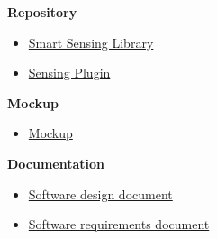\documentclass[12pt]{article}
\begin{document}
\textbf{Repository}
    \begin{itemize}
        \item \href{https://gitlab.uni-ulm.de/se-anwendungsprojekt-22-23/smart-sensing-library}{Smart Sensing Library}
        \item \href{https://gitlab.uni-ulm.de/se-anwendungsprojekt-22-23/sensing-plugin}{Sensing Plugin}
    \end{itemize}
 \textbf{Mockup}   
    \begin{itemize}
        \item \href{https://gitlab.uni-ulm.de/se-anwendungsprojekt-22-23/documentation/-/tree/master/Mockup}{Mockup}
    \end{itemize}
\textbf{Documentation}
\begin{itemize}
    \item \href{https://gitlab.uni-ulm.de/se-anwendungsprojekt-22-23/documentation/-/blob/master/Software%20design%20document/design_doc.pdf}{Software design document}
    \item \href{https://gitlab.uni-ulm.de/se-anwendungsprojekt-22-23/documentation/-/blob/master/Software%20requirements%20document/SRD.pdf}{Software requirements document}
\end{itemize}

    
 
\end{document}

